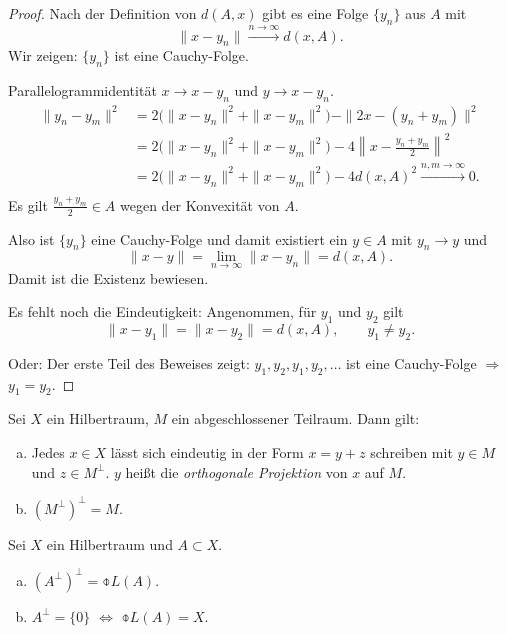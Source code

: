 \begin{proof}
  Nach der Definition von $d(A,x)$ gibt es eine Folge $\{y_n\}$ aus $A$ mit
  \[ \| x - y_n \| \xrightarrow{n \to \infty} d(x,A). \]
  Wir zeigen: $\{y_n\}$ ist eine Cauchy-Folge.

  Parallelogrammidentität $x \to x - y_n$ und $y \to x - y_n$.
  \begin{align*}
    \| y_n - y_m \|^2
    &= 2 \big( \|x-y_n\|^2 + \|x-y_m\|^2 \big) - \| 2x - (y_n + y_m) \|^2 \\
    &= 2 \big( \|x-y_n\|^2 + \|x-y_m\|^2 \big)
      - 4 \left\| x - \frac{y_n+y_m}{2} \right\|^2 \\
    &= 2 \big( \|x-y_n\|^2 + \|x-y_m\|^2 \big)
      - 4 d(x,A)^2 \xrightarrow{n,m \to \infty} 0. \\
  \end{align*}
  Es gilt $\frac{y_n+y_m}{2} \in A$ wegen der Konvexität von $A$.

  Also ist $\{y_n\}$ eine Cauchy-Folge und damit existiert ein $y \in A$ mit
  $y_n \to y$ und
  \[ \| x - y \| = \lim_{n \to \infty} \| x - y_n \| = d(x,A). \]
  Damit ist die Existenz bewiesen.

  Es fehlt noch die Eindeutigkeit: Angenommen, für $y_1$ und $y_2$ gilt
  \[ \| x - y_1 \| = \| x - y_2 \| = d(x,A), \qquad y_1 \ne y_2. \]

  Oder: Der erste Teil des Beweises zeigt: $y_1, y_2, y_1, y_2, \ldots$ ist eine
  Cauchy-Folge $\Rightarrow$ $y_1 = y_2$.
\end{proof}

\begin{thm}[Projektionssatz] %
  Sei $X$ ein Hilbertraum, $M$ ein abgeschlossener Teilraum. Dann gilt:
  \begin{enumerate}[a)]
  \item Jedes $x \in X$ lässt sich eindeutig in der Form $x = y + z$ schreiben
    mit $y \in M$ und $z \in M^\perp$. $y$ heißt die \emph{orthogonale
      Projektion} von $x$ auf $M$.
  \item $(M^\perp)^\perp = M$.
  \end{enumerate}
\end{thm}

\clearpage

\begin{aufg} %
  Sei $X$ ein Hilbertraum und $A \subset X$.
  \begin{enumerate}[a)]
  \item $(A^\perp)^\perp = \obar{L(A)}$.
  \item $A^\perp = \{0\}$ $\Leftrightarrow$ $\obar{L(A)} = X$.
  \end{enumerate}
\end{aufg}

